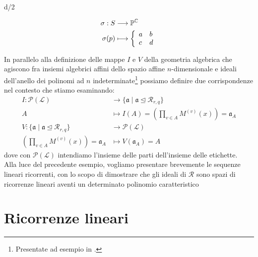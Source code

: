 \llcorner d/2 \lrcorner


    \begin{align*}
      \sigma :S  &\longrightarrow \mathbb{P}^{\mathbb{C}} \\
      \sigma(p) &\longmapsto
      \left\{ \begin{array}{l l}
                 a & b \\
                 c & d
              \end{array} \right.
    \end{align*}





    In parallelo alla definizione delle mappe $I$ e $V$ della geometria algebrica che agiscono fra insiemi algebrici affini dello spazio affine $n$-dimensionale e ideali dell'anello dei polinomi ad $n$ indeterminate\footnote{Presentate ad esempio in .} possiamo definire due corrispondenze nel contesto che stiamo esaminando:
\begin{align*}
   I: \mathcal{P}(\mathscr{L})  &\longrightarrow
                       \lbrace \mathfrak{a} \mid \mathfrak{a} \trianglelefteq \mathcal{R}_{r,q} \rbrace  \\
              A &\longmapsto I(A) = (\prod_{v\in A} M^{(v)}(x)) = \mathfrak{a}_{A} \\
   V: \lbrace \mathfrak{a} \mid \mathfrak{a} \trianglelefteq \mathcal{R}_{r,q} \rbrace  &\longrightarrow
	                \mathcal{P}(\mathscr{L})  \\
              (\prod_{v\in A} M^{(v)}(x)) = \mathfrak{a}_{A}  &\longmapsto V(\mathfrak{a}_{A}) = A
\end{align*}
dove con $\mathcal{P}(\mathscr{L})$ intendiamo l'insieme delle parti dell'insieme delle etichette.\\


Alla luce del precedente esempio, vogliamo presentare brevemente le sequenze lineari ricorrenti, con lo scopo di dimostrare che gli ideali di $\mathcal{R}$ sono spazi di ricorrenze lineari aventi un determinato polinomio caratteristico



\section{Ricorrenze lineari}

